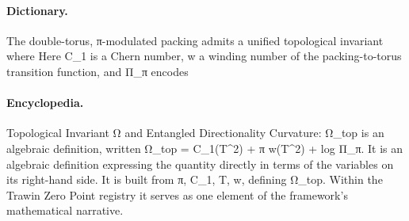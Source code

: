 \paragraph{Dictionary.}
The double-torus, π-modulated packing admits a unified topological invariant where Here C\_1 is a Chern number, w a winding number of the packing-to-torus transition function, and Π\_π encodes

\paragraph{Encyclopedia.}
Topological Invariant Ω and Entangled Directionality Curvature: Ω\_top is an algebraic definition, written Ω\_top = C\_1(T\textasciicircum{}2) + π w(T\textasciicircum{}2) + log Π\_π. It is an algebraic definition expressing the quantity directly in terms of the variables on its right-hand side. It is built from π, C\_1, T, w, defining Ω\_top. Within the Trawin Zero Point registry it serves as one element of the framework's mathematical narrative.
